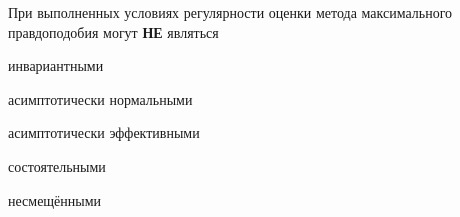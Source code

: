 
\begin{question}
При выполненных условиях регулярности оценки метода максимального
правдоподобия могут \textbf{НЕ} являться
\begin{answerlist}
  \item инвариантными
  \item асимптотически нормальными
  \item асимптотически эффективными
  \item состоятельными
  \item несмещёнными
\end{answerlist}
\end{question}


